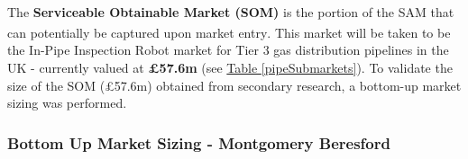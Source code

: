 \documentclass[11pt]{article}		%
\newcommand{\supercite}[1]{\textsuperscript{\cite{#1}}}		%
\newcommand{\tableref}[1]{\hyperref[#1]{Table \ref*{#1}}}     %
\begin{document}
        \\
        \hspace*{2ex}The \textbf{Serviceable Obtainable Market (SOM)} is the portion of the SAM that can potentially be captured upon market entry\supercite{tamsamsom}. This market will be taken to be the In-Pipe Inspection Robot market for Tier 3 gas distribution pipelines in the UK - currently valued at \textbf{£57.6m} (see \tableref{pipeSubmarkets}). To validate the size of the SOM (£57.6m) obtained from secondary research, a bottom-up market sizing was performed. 

    \subsubsection[Bottom Up Market Sizing]{Bottom Up Market Sizing - Montgomery Beresford} \label{bottomUp}
    
\end{document}
